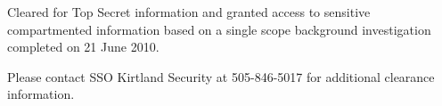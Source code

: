 \documentclass[10pt]{article}
\renewcommand{\section}[1]{\pagebreak[3]%
    \vspace{1.3\baselineskip}%
    \phantomsection\addcontentsline{toc}{section}{#1}%
    \noindent\llap{\scshape\smash{\parbox[t]{\marginparwidth}{\hyphenpenalty=10000\raggedright #1}}}%
    \vspace{-\baselineskip}\par}
\begin{document}
Cleared for Top Secret information and granted access to sensitive compartmented information based on a single scope background investigation completed on 21 June 2010.

Please contact SSO Kirtland Security at 505-846-5017 for additional clearance information.

%

%
%
%


%
%
\end{document}
